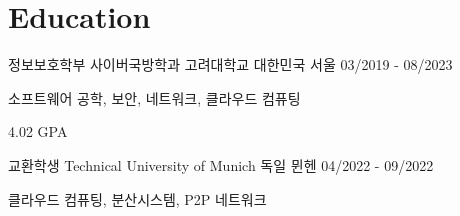 \vspace{-\acvSectionTopSkip}
\section{Education}
\cventry
{정보보호학부 사이버국방학과} %
{고려대학교} %
{대한민국 서울} %
{03/2019 - 08/2023} %
\begin{cvitems}
\item {소프트웨어 공학, 보안, 네트워크, 클라우드 컴퓨팅}
\item {4.02 GPA}
\end{cvitems}

\cventry
{교환학생} %
{Technical University of Munich} %
{독일 뮌헨} %
{04/2022 - 09/2022} %
\begin{cvitems}
\item {클라우드 컴퓨팅, 분산시스템, P2P 네트워크}
\end{cvitems}

